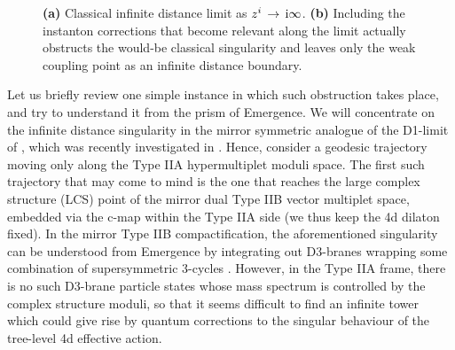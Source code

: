 %
\begin{figure}[t]
		\begin{center}
			\qquad \qquad\qquad
			\caption{\textbf{(a)} Classical infinite distance limit as $z^i \, \to \,\text{i} \infty$. \textbf{(b)} Including the instanton corrections that become relevant along the limit actually obstructs the would-be classical singularity and leaves only the weak coupling point as an infinite distance boundary.}			
		\label{fig:Instantoncorrections}
		\end{center}
\end{figure} 
%	
Let us briefly review one simple instance in which such obstruction takes place, and try to understand it from the prism of Emergence. We will concentrate on the infinite distance singularity in the mirror symmetric analogue of the D1-limit of \cite{Baume:2019sry}, which was recently investigated in \cite{Alvarez-Garcia:2021pxo}. Hence, consider a geodesic trajectory moving only along the Type IIA hypermultiplet moduli space. The first such trajectory that may come to mind is the one that reaches the large complex structure (LCS) point of the mirror dual Type IIB vector multiplet space, embedded via the c-map within the Type IIA side (we thus keep the 4d dilaton fixed). In the mirror Type IIB compactification, the aforementioned singularity can be understood from Emergence by integrating out D3-branes wrapping some combination of supersymmetric 3-cycles \cite{Grimm:2018ohb, Grimm:2018cpv}. However, in the Type IIA frame, there is no such D3-brane particle states whose mass spectrum is controlled by the complex structure moduli, so that it seems difficult to find an infinite tower which could give rise by quantum corrections to the singular behaviour of the tree-level 4d effective action. 
		

